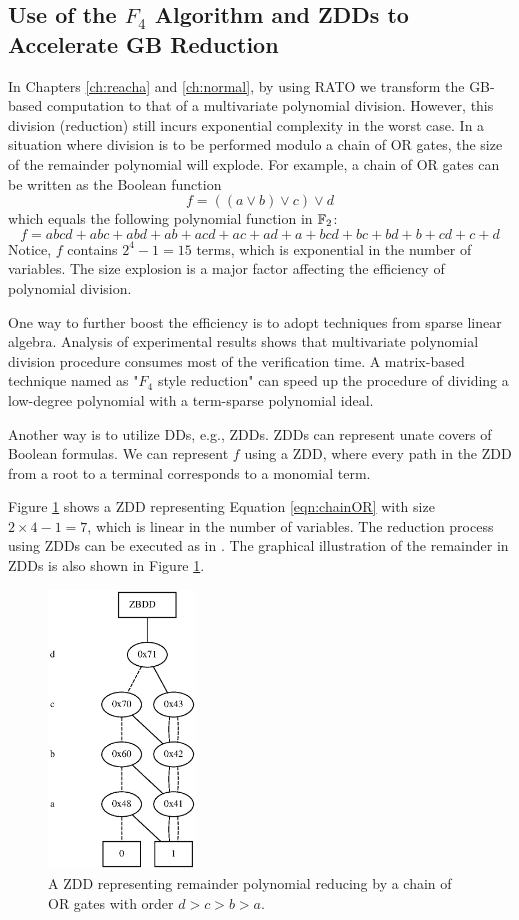 \subsection{Use of the $F_4$ Algorithm and ZDDs to Accelerate GB Reduction}
In Chapters \ref{ch:reacha} and \ref{ch:normal}, by using RATO we transform the GB-based
computation to that of a multivariate polynomial division. However, this division (reduction)
still incurs exponential complexity in the worst case. In a situation where division is to be performed modulo
a chain of OR gates, the size of the remainder polynomial will explode. For example, a chain of OR gates 
can be written as the Boolean function 
\begin{equation}
\label{eqn:chainOR}
f = ((a\lor b) \lor c) \lor d
\end{equation}
which equals the following polynomial function in ${\mathbb{F}}_2$:
$$f = abcd+abc+abd+ab+acd+ac+ad+a+bcd+bc+bd+b+cd+c+d$$
Notice, $f$ contains $2^4-1 = 15$ terms, which is exponential in the number of variables.
The size explosion is a major factor affecting the efficiency of polynomial division.

One way to further boost the efficiency is to adopt techniques from sparse linear algebra.
Analysis of experimental results shows that multivariate polynomial division procedure
consumes most of the verification time.
A matrix-based technique named as "$F_4$ style reduction" \cite{f4} can speed up the procedure of
dividing a low-degree polynomial with a term-sparse polynomial ideal. 

Another way is to utilize DDs, e.g., ZDDs. ZDDs can represent unate covers of Boolean formulas.
We can represent $f$ using a ZDD, where every path in the ZDD from a root to a terminal corresponds
to a monomial term.

Figure \ref{fig:ZDD} shows a ZDD representing 
Equation \ref{eqn:chainOR} with size $2\times4 -1 = 7$, which is linear in the number of variables.
The reduction process using ZDDs can be executed as in \cite{PolyBoRi}. The graphical illustration 
of the remainder in ZDDs is also shown in Figure \ref{fig:ZDD}. 

\begin{figure}[bp]
\centerline{
\includegraphics[width=0.35\textwidth]{newfig/ZDD.eps}
}
\caption{A ZDD representing remainder polynomial reducing by a chain of OR gates with order $d>c>b>a$.}
\label{fig:ZDD}
\end{figure}

